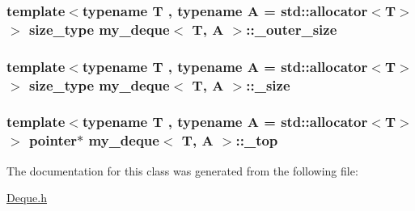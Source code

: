 \hypertarget{classmy__deque_acc99670ac05b126e60a9f618464f447e}{
\subsubsection[{\-\_\-outer\-\_\-size}]{\setlength{\rightskip}{0pt plus 5cm}template$<$typename T , typename A  = std\-::allocator$<$\-T$>$$>$ {\bf size\-\_\-type} {\bf my\-\_\-deque}$<$ T, A $>$\-::\-\_\-outer\-\_\-size\hspace{0.3cm}{\ttfamily [private]}}}\label{classmy__deque_acc99670ac05b126e60a9f618464f447e}
\hypertarget{classmy__deque_a09ccb24518345bf20902896ebcdffd33}{
\subsubsection[{\-\_\-size}]{\setlength{\rightskip}{0pt plus 5cm}template$<$typename T , typename A  = std\-::allocator$<$\-T$>$$>$ {\bf size\-\_\-type} {\bf my\-\_\-deque}$<$ T, A $>$\-::\-\_\-size\hspace{0.3cm}{\ttfamily [private]}}}\label{classmy__deque_a09ccb24518345bf20902896ebcdffd33}
\hypertarget{classmy__deque_a80b6e5acbf5d1a04dc3de744b9283cb0}{
\subsubsection[{\-\_\-top}]{\setlength{\rightskip}{0pt plus 5cm}template$<$typename T , typename A  = std\-::allocator$<$\-T$>$$>$ {\bf pointer}$\ast$ {\bf my\-\_\-deque}$<$ T, A $>$\-::\-\_\-top\hspace{0.3cm}{\ttfamily [private]}}}\label{classmy__deque_a80b6e5acbf5d1a04dc3de744b9283cb0}


The documentation for this class was generated from the following file\-:\begin{DoxyCompactItemize}
\item 
\hyperlink{Deque_8h}{Deque.\-h}\end{DoxyCompactItemize}
